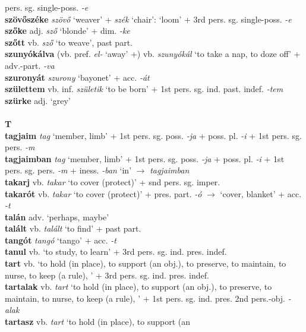 \documentclass[11pt]{article}
\begin{document}
pers. sg. single\hyp{}poss. \emph{-e} \\
\textbf{szövőszéke} \emph{szövő} `weaver' + \emph{szék} `chair':
`loom' + 3rd pers. sg. single\hyp{}poss. \emph{-e} \\
\textbf{szőke} adj. \emph{sző} `blonde' + dim. \emph{-ke} \\
\textbf{szőtt} vb. \emph{sző} `to weave', past part. \\
\textbf{szunyókálva} (vb. pref. \emph{el-} `away' +)
vb. \emph{szunyókál} `to take a nap, to doze off' +
adv.\hyp{}part. \emph{-va} \\
\textbf{szuronyát} \emph{szurony} `bayonet' + acc. \emph{-át} \\
\textbf{születtem} vb. inf. \emph{születik} `to be born' + 1st
pers. sg. ind. past. indef. \emph{-tem} \\
\textbf{szürke} adj. `grey' \\
\ \\
\noindent \textbf{\large T} \\
\textbf{tagjaim} \emph{tag} `member, limb' + 1st
pers. sg. poss. \emph{-ja} + poss. pl. \emph{-i} + 1st
  pers. sg. pers. \emph{-m} \\
\textbf{tagjaimban} \emph{tag} `member, limb' + 1st
pers. sg. poss. \emph{-ja} + poss. pl. \emph{-i} + 1st
  pers. sg. pers. \emph{-m} + iness. \emph{-ban} `in'
  $\rightarrow$ \emph{tagjaimban} \\
\textbf{takarj} vb. \emph{takar} `to cover (protect)' + snd pers. sg. imper. \\
\textbf{takarót} vb. \emph{takar} `to cover (protect)' +
pres. part. \emph{-ó} $\rightarrow$ `cover, blanket' +
acc. \emph{-t} \\
\textbf{talán} adv. `perhaps, maybe' \\
\textbf{talált} vb. \emph{talált} `to find' + past part. \\
\textbf{tangót} \emph{tangó} `tango' + acc. \emph{-t} \\
\textbf{tanul} vb. `to study, to learn' + 3rd pers. sg. ind. pres. indef. \\
\textbf{tart} vb. `to hold (in place), to support (an
obj.), to preserve, to maintain, to nurse, to keep (a rule), ' + 3rd
pers. sg. ind. pres. indef. \\
\textbf{tartalak} vb. \emph{tart} `to hold (in place), to support (an
obj.), to preserve, to maintain, to nurse, to keep (a rule), ' + 1st
pers. sg. ind. pres. 2nd pers.\hyp{}obj. \emph{-alak} \\
\textbf{tartasz} vb. \emph{tart} `to hold (in place), to support (an
\end{document}

